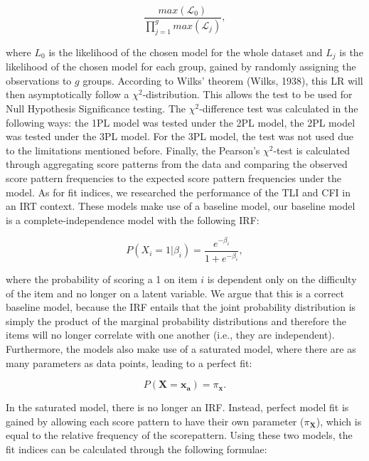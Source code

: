 \documentclass[Royal,sageapa,times,doublespace]{sagej}
\begin{document}
\begin{equation}
\frac{max(\mathcal{L}_0)}{\prod_{j = 1}^g max(\mathcal{L}_j)},
\end{equation}

where $L_0$ is the likelihood of the chosen model for the whole dataset and $L_j$ is the likelihood of the chosen model for each group, gained by randomly assigning the observations to $g$ groups. According to Wilks' theorem (Wilks, 1938), this LR will then asymptotically follow a $\chi^2$-distribution. This allows the test to be used for Null Hypothesis Significance testing. The $\chi^2$-difference test was calculated in the following ways: the 1PL model was tested under the 2PL model, the 2PL model was tested under the 3PL model. For the 3PL model, the test was not used due to the limitations mentioned before. Finally, the Pearson's $\chi^2$-test is calculated through aggregating score patterns from the data and comparing the observed score pattern frequencies to the expected score pattern frequencies under the model. As for fit indices, we researched the performance of the TLI and CFI in an IRT context. These models make use of a baseline model, our baseline model is a complete-independence model with the following IRF:

\begin{equation}
P(X_i = 1 | \beta_{i}) = \frac{e^{- \beta_{i}}}{1 + e^{- \beta_{i}}},
\end{equation}

where the probability of scoring a 1 on item $i$ is dependent only on the difficulty of the item and no longer on a latent variable. We argue that this is a correct baseline model, because the IRF entails that the joint probability distribution is simply the product of the marginal probability distributions and therefore the items will no longer correlate with one another (i.e., they are independent). Furthermore, the models also make use of a saturated model, where there are as many parameters as data points, leading to a perfect fit:

\begin{equation}
P(\boldsymbol{X} = \boldsymbol{x_a}) = \pi_{\boldsymbol{x}}.
\end{equation}

In the saturated model, there is no longer an IRF. Instead, perfect model fit is gained by allowing each score pattern to have their own parameter ($\pi_{\boldsymbol{X}}$), which is equal to the relative frequency of the scorepattern. Using these two models, the fit indices can be calculated through the following formulae:
\end{document}
